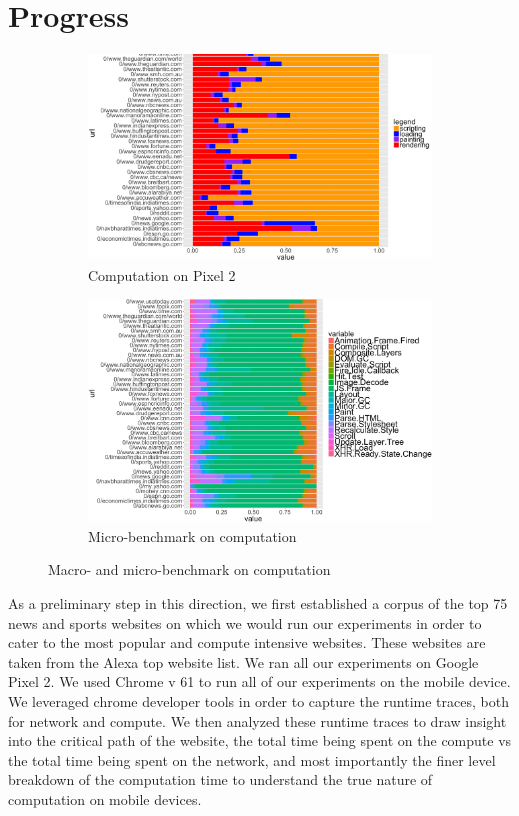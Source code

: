 \section{Progress}
\label{sec:Progress}

\begin{figure}[!bth]
\begin{subfigure}[b]{0.5\textwidth}
\includegraphics[width=0.99\linewidth]{figs/comp_1.png}
\caption{Computation on Pixel 2}
\label{fig:act_p2}
\end{subfigure}
\begin{subfigure}[b]{0.5\textwidth}
\includegraphics[width=\linewidth]{figs/comp_2.png}
\caption{Micro-benchmark on computation}
\label{fig:cat_p2}
\end{subfigure}
\caption{Macro- and micro-benchmark on computation}
\end{figure}

As a preliminary step in this direction, we first established a corpus of the top
75 news and sports websites on which we would run our experiments
in order to cater to the most popular and compute intensive websites. 
These websites are taken from the Alexa top website list.
We ran all our experiments on Google Pixel 2. We used Chrome v 61 to run all of our experiments on the mobile device. We leveraged chrome developer tools in order
to capture the runtime traces, both for network and compute. We then analyzed these runtime
traces to draw insight into the critical path of the website, the total time being spent on the 
compute vs the total time being spent on the network, and most importantly the finer
level breakdown of the computation time to understand the true nature of computation on mobile
devices. 


